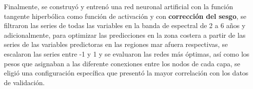 Finalmente, se construyó y entrenó una red neuronal artificial con la función tangente hiperbólica como función de activación y con \textbf{corrección del sesgo}, se filtraron las series de todas las variables en la banda de espectral de 2 a 6 años y adicionalmente, para optimizar las predicciones en la zona costera a partir de las series de las variables predictoras en las regiones mar afuera respectivas, se escalaron las series entre -1 y 1 y se evaluaron las redes más óptimas, así como los pesos que asignaban a las diferente conexiones entre los nodos de cada capa, se eligió una configuración específica que presentó la mayor correlación con los datos de validación.

